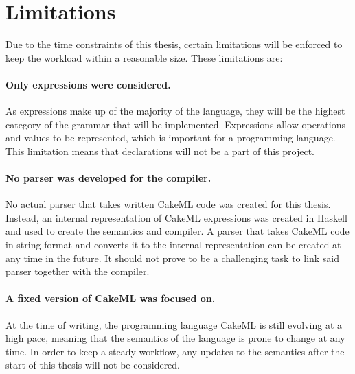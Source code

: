 \section{Limitations}
\label{sec:limitations}
Due to the time constraints of this thesis, certain limitations will be enforced
to keep the workload within a reasonable size. These limitations are:

\paragraph{Only expressions were considered.}
As expressions make up of the majority of the language, they will be the highest
category of the grammar that will be implemented. Expressions allow operations 
and values to be represented, which is important for a programming language.
This limitation  means that declarations will not be a part of this project.

\paragraph{No parser was developed for the compiler.}
No actual parser that takes written CakeML code was created for this thesis.
Instead, an internal representation of CakeML expressions was created in
Haskell and used to create the semantics and compiler. A parser that
takes CakeML code in string format and converts it to the internal
representation can be created at any time in the future. It should not prove to
be a challenging task to link said parser together with the compiler.

\paragraph{A fixed version of CakeML was focused on.}
At the time of writing, the programming language CakeML is still evolving at a
high pace, meaning that the semantics of the language is prone to change at
any time. In order to keep a steady workflow, any updates to the semantics after
the start of this thesis will not be considered.
